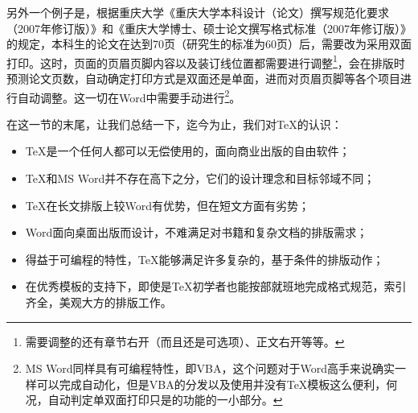 另外一个例子是，根据重庆大学《重庆大学本科设计（论文）撰写规范化要求（2007年修订版）》和《重庆大学博士、硕士论文撰写格式标准（2007年修订版）》的规定，本科生的论文在达到70页（研究生的标准为60页）后，需要改为采用双面打印。这时，页面的页眉页脚内容以及装订线位置都需要进行调整\footnote{需要调整的还有章节右开（而且还是可选项）、正文右开等等。}，\cquthesis 会在排版时预测论文页数，自动确定打印方式是双面还是单面，进而对页眉页脚等各个项目进行自动调整。这一切在Word中需要手动进行\footnote{MS Word同样具有可编程特性，即VBA，这个问题对于Word高手来说确实一样可以完成自动化，但是VBA的分发以及使用并没有\TeX 模板这么便利，何况，自动判定单双面打印只是\cquthesis 的功能的一小部分。}。

在这一节的末尾，让我们总结一下，迄今为止，我们对\TeX 的认识：
\begin{itemize}
	\item \TeX 是一个任何人都可以无偿使用的，面向商业出版的自由软件；
	\item \TeX 和MS Word并不存在高下之分，它们的设计理念和目标邻域不同；
	\item \TeX 在长文排版上较Word有优势，但在短文方面有劣势；
	\item Word面向桌面出版而设计，不难满足对书籍和复杂文档的排版需求；
	\item 得益于可编程的特性，\TeX 能够满足许多复杂的，基于条件的排版动作；
	\item 在优秀模板的支持下，即使是\TeX 初学者也能按部就班地完成格式规范，索引齐全，美观大方的排版工作。
\end{itemize}